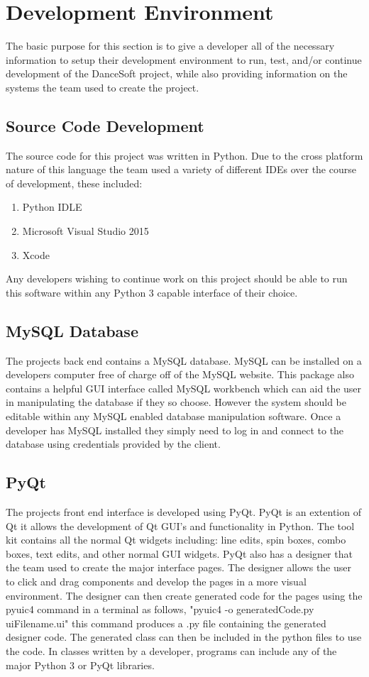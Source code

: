 \section{Development Environment}
The basic purpose for this section is to give a developer all of the necessary information to setup their development environment to run, test, and/or continue development of the DanceSoft project, while also providing information on the systems the team used to create the project.

\subsection{Source Code Development}
The source code for this project was written in Python. Due to the cross platform nature of this language the team used a variety of different IDEs over the course of development, these included:

\begin{enumerate}
\item Python IDLE
\item Microsoft Visual Studio 2015
\item Xcode 
\end{enumerate}

Any developers wishing to continue work on this project should be able to run this software within any Python 3 capable interface of their choice.  

\subsection{MySQL Database}
The projects back end contains a MySQL database. MySQL can be installed on a developers computer free of charge off of the MySQL website. This package also contains a helpful GUI interface called MySQL workbench which can aid the user in manipulating the database if they so choose. However the system should be editable within any MySQL enabled database manipulation software. Once a developer has MySQL installed they simply need to log in and connect to the database using credentials provided by the client.

\subsection{PyQt}
The projects front end interface is developed using PyQt. PyQt is an extention of Qt it allows the development of Qt GUI's and functionality in Python. The tool kit contains all the normal Qt widgets including: line edits, spin boxes, combo boxes, text edits, and other normal GUI widgets. PyQt also has a designer that the team used to create the major interface pages. The designer allows the user to click and drag components and develop the pages in a more visual environment. The designer can then create generated code for the pages using the pyuic4 command in a terminal as follows, "pyuic4 -o generatedCode.py uiFilename.ui" this command produces a .py file containing the generated designer code. The generated class can then be included in the python files to use the code. In classes written by a developer, programs can include any of the major Python 3 or PyQt libraries.

